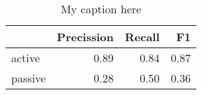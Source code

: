 \begin{table}[!ht]
\centering
\begin{tabular}{lrrr}
\toprule
{} &  Precission &  Recall &   F1 \\
\midrule
active  &        0.89 &    0.84 & 0.87 \\
passive &        0.28 &    0.50 & 0.36 \\
\bottomrule
\end{tabular}
\caption{My caption here}
\label{tab:VOICE-ocd-combined-F1}
\end{table}